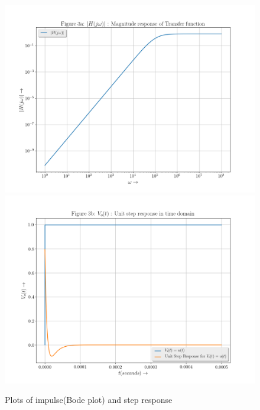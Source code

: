 \documentclass[11pt, a4paper]{article}
\begin{document}
\newpage
\begin{figure}[!tbh]
  \centering
  \includegraphics[scale=0.4]{./../Extras/A73a.png}  %
  \includegraphics[scale=0.4]{./../Extras/A73b.png}  %
 
  \caption{Plots of impulse(Bode plot) and step response}
\end{figure}

\newpage
\end{document}
